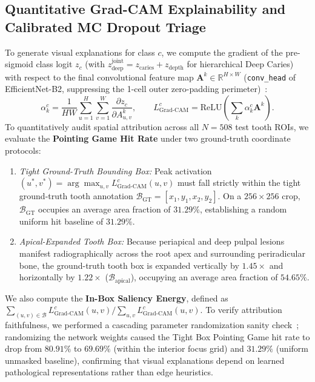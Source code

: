 \documentclass[review]{elsarticle}
\begin{document}
\subsection{Quantitative Grad-CAM Explainability and Calibrated MC Dropout Triage}
To generate visual explanations for class $c$, we compute the gradient of the pre-sigmoid class logit $z_c$ (with $z_{\text{deep}}^{\text{joint}} = z_{\text{caries}} + z_{\text{depth}}$ for hierarchical Deep Caries) with respect to the final convolutional feature map $\mathbf{A}^k \in \mathbb{R}^{H \times W}$ (\texttt{conv\_head} of EfficientNet-B2, suppressing the 1-cell outer zero-padding perimeter)~\cite{selvaraju2017gradcam}:
\begin{equation}
    \alpha_k^c = \frac{1}{H W}\sum_{u=1}^{H}\sum_{v=1}^{W} \frac{\partial z_c}{\partial A_{u,v}^k}, \qquad L_{\text{Grad-CAM}}^c = \text{ReLU}\!\left(\sum_{k} \alpha_k^c \mathbf{A}^k\right).
    \label{eq:gradcam}
\end{equation}
To quantitatively audit spatial attribution across all $N=508$ test tooth ROIs, we evaluate the \textbf{Pointing Game Hit Rate} under two ground-truth coordinate protocols:
\begin{enumerate}
    \item \emph{Tight Ground-Truth Bounding Box:} Peak activation $(u^*, v^*) = \arg\max_{u,v} L_{\text{Grad-CAM}}^c(u,v)$ must fall strictly within the tight ground-truth tooth annotation $\mathcal{B}_{\text{GT}} = [x_1, y_1, x_2, y_2]$. On a $256 \times 256$ crop, $\mathcal{B}_{\text{GT}}$ occupies an average area fraction of $31.29\%$, establishing a random uniform hit baseline of $31.29\%$.
    \item \emph{Apical-Expanded Tooth Box:} Because periapical and deep pulpal lesions manifest radiographically across the root apex and surrounding periradicular bone, the ground-truth tooth box is expanded vertically by $1.45\times$ and horizontally by $1.22\times$ ($\mathcal{B}_{\text{apical}}$), occupying an average area fraction of $54.65\%$.
\end{enumerate}
We also compute the \textbf{In-Box Saliency Energy}, defined as $\sum_{(u,v)\in \mathcal{B}} L_{\text{Grad-CAM}}^c(u,v) \big/ \sum_{u,v} L_{\text{Grad-CAM}}^c(u,v)$. To verify attribution faithfulness, we performed a cascading parameter randomization sanity check~\cite{adebayo2018sanity}; randomizing the network weights caused the Tight Box Pointing Game hit rate to drop from $80.91\%$ to $69.69\%$ (within the interior focus grid) and $31.29\%$ (uniform unmasked baseline), confirming that visual explanations depend on learned pathological representations rather than edge heuristics.
\end{document}
